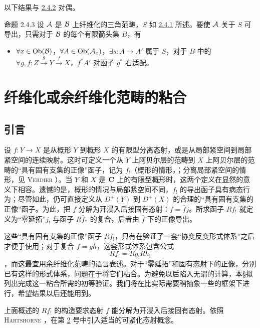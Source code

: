 以下结果与 \hyperref[XVII.cor2.4.2]{2.4.2} 对偶。

\begin{enonce*}{命题 2.4.3}
设 ${\mathcal A}$ 是 ${\mathcal B}$ 上纤维化的三角范畴，$S$ 如 \hyperref[XVII.prop2.4.1]{2.4.1} 所述。要使 ${\mathcal A}$ 关于 $S$ 可导出，只需对于 ${\mathcal B}$ 的每个有限箭头集 $B$，有
\begin{itemize}
\item[$(\ast')$] $\forall x\in\operatorname{Ob}({\mathcal B})$，$\forall A\in\operatorname{Ob}({\mathcal A}_x)$，$\exists s:A\rightarrow A'$ 属于 $S$，对于 $B$ 中的 $\forall g,f:Z\xrightarrow{g}Y\xrightarrow{f}X$，$f^{\ast}A'$ 对函子 $g^{\ast}$ 右适配。
\end{itemize}
\end{enonce*}

\section{纤维化或余纤维化范畴的粘合}\pageoriginale

\subsection{引言}

设 $f:Y\rightarrow X$ 是从概形 $Y$ 到概形 $X$ 的有限型分离态射，或是从局部紧空间到局部紧空间的连续映射。这时可定义一个从 $Y$ 上阿贝尔层的范畴到 $X$ 上阿贝尔层的范畴的“具有固有支集的正像”函子，记为 $f_{!}$（概形的情形，\cf {}；分离局部紧空间的情形，见 \textsc{Verdier} \cite{sga4.exp.XVII.bib.V3}）。当 $Y$ 和 $X$ 是 $\mathbf{C}$ 上的有限型概形时，这两个定义在显然的意义下相容。遗憾的是，概形的情况与局部紧空间不同，$f_{!}$ 的导出函子具有病态行为；尽管如此，仍可直接定义从 $D^{+}(Y)$ 到 $D^{+}(X)$ 的合理的“具有固有支集的正像”函子。为此，把 $f$ 分解为开浸入后接固有态射：$f=\bar f j$。所求函子 $Rf_{!}$ 就定义为“零延拓”$j_{!}$ 与函子 $R\bar f_{\ast}$ 的复合，后者由 $\bar f$ 下的正像导出。

这些“具有固有支集的正像”函子 $Rf_{!}$，只有在验证了一套“协变反变形式体系”之后才便于使用；对于复合 $f=gh$，这套形式体系包含公式
\[
Rf_{!}=Rg_{!}Rh_{!}
\]
，而这最宜用余纤维化范畴的语言表述。对于“零延拓”和固有态射下的\pageoriginale 正像，分别已有这样的形式体系，问题在于将它们粘合。为避免以后陷入无谓的计算，本\S 拟列出完成这一粘合所需的初等验证。我们将在比实际需要稍抽象一些的框架下进行，希望结果以后还能用到。

上面概述的 $Rf_{!}$ 的构造要求态射 $f$ 能分解为开浸入后接固有态射。依照 \textsc{Hartshorne} \cite[III 8 第~189 页]{sga4.exp.XVII.bib.RD}，在第 \hyperref[XVII.subsec3.2]{2} 号中引入适当的可紧化态射概念。

